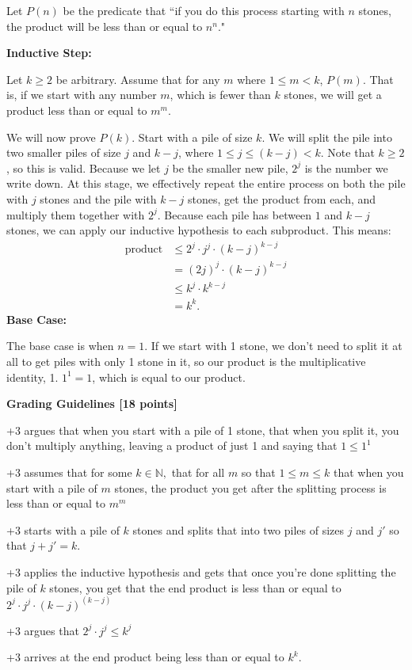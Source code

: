 \documentclass[12pt]{exam}
\begin{document}
\begin{solution}
Let $P(n)$ be the predicate that ``if you do this process starting with $n$ stones, the product will be less than or equal to $n^n$."

\textbf{Inductive Step:}

Let $k\geq2$ be arbitrary. Assume that for any $m$ where $1\leq m < k$, $P(m)$.  That is, if we start with any number $m$, which is fewer than $k$ stones, we will get a product less than or equal to $m^m$.

We will now prove $P(k)$.  Start with a pile of size $k$.  We will split the pile into two smaller piles of size $j$ and $k-j$, where $1\leq j\leq (k-j)<k$.  Note that $k\geq 2$, so this is valid.  Because we let $j$ be the smaller new pile, $2^j$ is the number we write down.  At this stage, we effectively repeat the entire process on both the pile with $j$ stones and the pile with $k-j$ stones, get the product from each, and multiply them together with $2^j$.  Because each pile has between $1$ and $k-j$ stones, we can apply our inductive hypothesis to each subproduct. This means:
\begin{align*}
\text{product}&\leq 2^j\cdot j^j\cdot (k-j)^{k-j} \tag{IH}\\
&=(2j)^j \cdot (k-j)^{k-j} \tag{$a^c\cdot b^c=(ab)^c$} \\
&\leq k^j \cdot k^{k-j} \tag{$j\leq k-j,$ so $2j\leq k$} \\
&=k^k.
\end{align*}
\textbf{Base Case:}

The base case is when $n=1.$ If we start with 1 stone, we don't need to split it at all to get piles with only 1 stone in it, so our product is the multiplicative identity, 1.  $1^1=1$, which is equal to our product.

\textbf{Grading Guidelines [18 points]}
\begin{gwguidelines}
    \item{+3 argues that when you start with a pile of 1 stone, that when you split it, you don't multiply anything, leaving a product of just 1 and saying that $1\le 1^1$}
    \item{+3 assumes that for some $k\in \mathbb N,$ that for all $m$ so that $1\le m\le k$ that when you start with a pile of $m$ stones, the product you get after the splitting process is less than or equal to $m^m$}
    \item{+3 starts with a pile of $k$ stones and splits that into two piles of sizes $j$ and $j'$ so that $j+j'=k$.}
    \item{+3 applies the inductive hypothesis and gets that once you're done splitting the pile of $k$ stones, you get that the end product is less than or equal to $2^j\cdot j^j\cdot (k - j)^{(k - j)}$}
    \item{+3 argues that $2^j\cdot j^j\le k^j$}
    \item{+3 arrives at the end product being less than or equal to $k^k$.}
\end{gwguidelines}
\end{solution}
\end{document}
